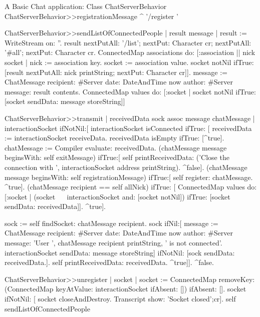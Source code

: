 \documentclass[a4paper,10pt,twoside]{book}
\begin{document}
\begin{script}{A Basic Chat application: Class ChatServerBehavior}
ChatServerBehavior>>registrationMessage
	^ '/register '

ChatServerBehavior>>sendListOfConnectedPeople
	| result message |
	result := WriteStream on: ''.
	result 
		nextPutAll: '/list';
		nextPut: Character cr;
		nextPutAll: '#all';
		nextPut: Character cr.
	ConnectedMap associations do: [:association || nick socket |
		nick := association key.
		socket := association value.
		socket notNil
			ifTrue: [result 
						nextPutAll: nick printString;
						nextPut: Character cr]].
	message := ChatMessage
					recipient: #Server
					date: DateAndTime now
					author: #Server
					message: result contents.
	ConnectedMap values do: [:socket |
		socket notNil
			ifTrue: [socket sendData: message storeString]]


ChatServerBehavior>>transmit
	| receivedData  sock assoc message chatMessage |
	interactionSocket ifNotNil:[
		interactionSocket isConnected 
			ifTrue: [	
				receivedData := interactionSocket receiveData.
				receivedData isEmpty ifTrue: [^true].
				chatMessage := Compiler evaluate: receivedData.
				(chatMessage message beginsWith: self exitMessage) 
					ifTrue:[
						self printReceivedData: ('Close the connection with ', interactionSocket address printString).
						^false].
				(chatMessage message beginsWith: self registrationMessage)
					ifTrue:[
						self register: chatMessage.
						^true].
				(chatMessage recipient == self allNick)
					ifTrue: [
						ConnectedMap values do: [:socket |
							(socket ~~ interactionSocket and: [socket notNil])
								ifTrue: [socket sendData: receivedData]].
						^true].
				
				sock := self findSocket: chatMessage recipient.
				sock 
					ifNil:[
						message := ChatMessage
										recipient: #Server
										date: DateAndTime now
										author: #Server
										message: 'User ', chatMessage recipient printString, ' is not connected'.
						interactionSocket sendData: message storeString]
					ifNotNil: [sock sendData: receivedData.].
				self printReceivedData: receivedData.
				^true]].
	^false.


ChatServerBehavior>>unregister
	| socket |
	socket := ConnectedMap removeKey: (ConnectedMap keyAtValue: interactionSocket ifAbsent: []) ifAbsent: [].
	socket ifNotNil: [
		 socket closeAndDestroy.
		Transcript show: 'Socket closed';cr].
	self sendListOfConnectedPeople
\end{script}
\end{document}
